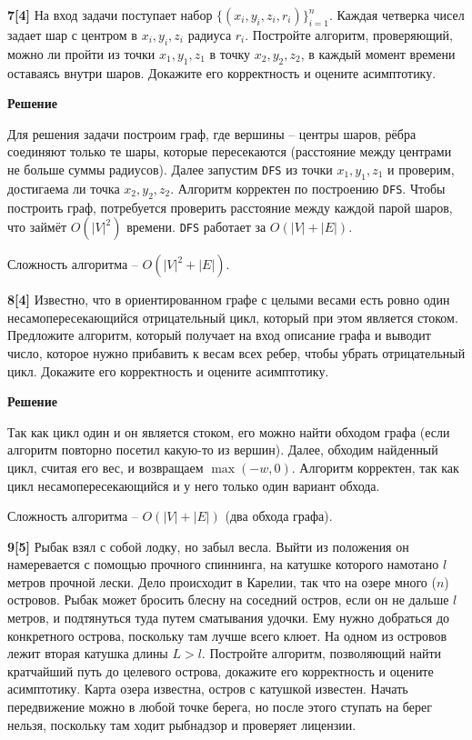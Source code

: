 \documentclass{article}
\begin{document}
\medskip

\textbf{7[4]} На вход задачи поступает набор $\{(x_i, y_i, z_i, r_i)\}_{i=1}^n$. Каждая четверка чисел задает шар с центром в $x_i, y_i, z_i$ радиуса $r_i$. Постройте алгоритм, проверяющий, можно ли пройти из точки $x_1, y_1, z_1$ в точку $x_2, y_2, z_2$, в каждый момент времени оставаясь внутри шаров. Докажите его корректность и оцените асимптотику.

\medskip

\textbf{Решение}

\medskip

Для решения задачи построим граф, где вершины -- центры шаров, рёбра соединяют
только те шары, которые пересекаются (расстояние между центрами не больше суммы радиусов).
Далее запустим \texttt{DFS} из точки $x_1, y_1, z_1$ и проверим, достигаема ли
точка $x_2, y_2, z_2$. Алгоритм корректен по построению \texttt{DFS}. Чтобы построить
граф, потребуется проверить расстояние между каждой парой шаров, что
займёт $O(|V|^2)$ времени. \texttt{DFS} работает за $O(|V| + |E|)$.

Сложность алгоритма -- $O(|V|^2 + |E|)$.

\medskip

\textbf{8[4]} Известно, что в ориентированном графе с целыми весами есть ровно один несамопересекающийся отрицательный цикл, который при этом является стоком. Предложите алгоритм, который получает на вход описание графа и выводит число, которое нужно прибавить к весам всех ребер, чтобы убрать отрицательный цикл. Докажите его корректность и оцените асимптотику.

\medskip

\textbf{Решение}

\medskip

Так как цикл один и он является стоком, его можно найти обходом графа
(если алгоритм повторно посетил какую-то из вершин). Далее, обходим
найденный цикл, считая его вес, и возвращаем $\max (-w, 0)$. Алгоритм
корректен, так как цикл несамопересекающийся и у него только один вариант
обхода.

Сложность алгоритма -- $O(|V| + |E|)$ (два обхода графа).

\medskip

\textbf{9[5]} Рыбак взял с собой лодку, но забыл весла. Выйти из положения он намеревается с помощью прочного спиннинга, на катушке которого намотано $l$ метров прочной лески. Дело происходит в Карелии, так что на озере много ($n$) островов. Рыбак может бросить блесну на соседний остров, если он не дальше $l$ метров, и подтянуться туда путем сматывания удочки. Ему нужно добраться до конкретного острова, поскольку там лучше всего клюет. На одном из островов лежит вторая катушка длины $L > l$. Постройте алгоритм, позволяющий найти кратчайший путь до целевого острова, докажите его корректность и оцените асимптотику. Карта озера известна, остров с катушкой известен. Начать передвижение можно в любой точке берега, но после этого ступать на берег нельзя, поскольку там ходит рыбнадзор и проверяет лицензии.
\end{document}
